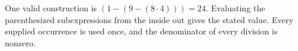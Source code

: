 One valid construction is $\boxed{(1-(9-(8\cdot 4)))=24}$. Evaluating the parenthesized subexpressions from the inside out gives the stated value. Every supplied occurrence is used once, and the denominator of every division is nonzero.
